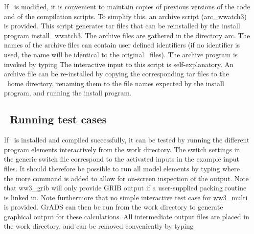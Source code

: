 If \ws\ is modified, it is convenient to maintain copies of previous versions
of the code and of the compilation scripts. To simplify this, an archive
script ({\file arc\_wwatch3}) is provided. This script generates {\file tar}
files that can be reinstalled by the install program {\file
install\_wwatch3}. The archive files are gathered in the directory {\dir
arc}. The names of the archive files can contain user defined identifiers (if
no identifier is used, the name will be identical to the original \ws\
files). The archive program is invoked by typing 
\noindent
The interactive input to this script is self-explanatory. An archive file can
be re-installed by copying the corresponding {\file tar} files to the \ws\
home directory, renaming them to the file names expected by the install
program, and running the install program.


\vssub
\subsection{~Running test cases} \label{sec:tests}
\vssub

If \ws\ is installed and compiled successfully, it can be tested by running
the different program elements interactively from the {\file work}
directory. The switch settings in the generic switch file correspond to the
activated inputs in the example input files. It should therefore be possible
to run all model elements by typing
where the {\code more} command is added to allow for on-screen inspection of
the output. Note that {\code ww3\_grib} will only provide GRIB output if a
user-supplied packing routine is linked in. Note furthermore that no simple
interactive test case for {\file ww3\_multi} is provided. GrADS can then be
run from the work directory to generate graphical output for these
calculations. All intermediate output files are placed in the {\file work}
directory, and can be removed conveniently by typing 

